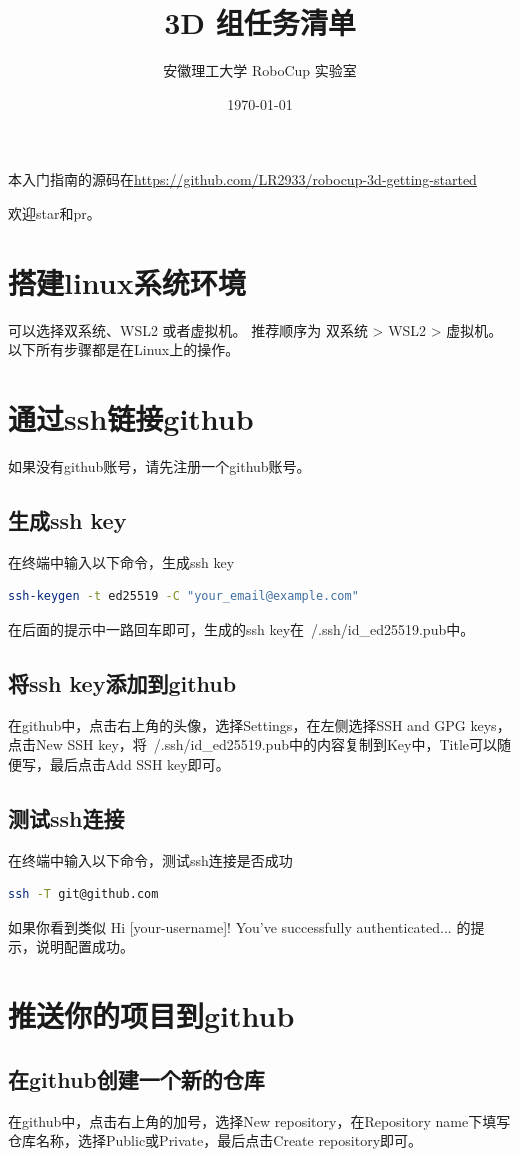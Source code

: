 \documentclass[11pt, UTF8, a4paper]{ctexart} %
\title{\textbf{3D 组任务清单}}
\author{安徽理工大学 RoboCup 实验室}
\date{\today}
\begin{document}
\maketitle

本入门指南的源码在\url{https://github.com/LR2933/robocup-3d-getting-started}

欢迎star和pr。
\tableofcontents %
\vspace{5cm} 
\newpage
\section{搭建linux系统环境}
可以选择双系统、WSL2 或者虚拟机。
\smallbreak
推荐顺序为 双系统 > WSL2 > 虚拟机。
\smallbreak
以下所有步骤都是在Linux上的操作。
\section{通过ssh链接github}
如果没有github账号，请先注册一个github账号。
\subsection{生成ssh key}
在终端中输入以下命令，生成ssh key
\begin{lstlisting}[language=bash]
ssh-keygen -t ed25519 -C "your_email@example.com"
\end{lstlisting}
\smallbreak
在后面的提示中一路回车即可，生成的ssh key在~/.ssh/id\_ed25519.pub中。
\subsection{将ssh key添加到github}
在github中，点击右上角的头像，选择Settings，在左侧选择SSH and GPG keys，点击New SSH key，将~/.ssh/id\_ed25519.pub中的内容复制到Key中，Title可以随便写，最后点击Add SSH key即可。
\subsection{测试ssh连接}
在终端中输入以下命令，测试ssh连接是否成功
\begin{lstlisting}[language=bash]
ssh -T git@github.com
\end{lstlisting}
\smallbreak
如果你看到类似 Hi [your-username]! You've successfully authenticated... 的提示，说明配置成功。

\section{推送你的项目到github}
\subsection{在github创建一个新的仓库}
在github中，点击右上角的加号，选择New repository，在Repository name下填写仓库名称，选择Public或Private，最后点击Create repository即可。
\end{document}

